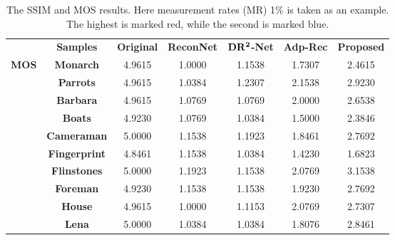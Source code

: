 \documentclass[review]{elsarticle}
\begin{document}
\begin{table}[h!]
	\centering
	\footnotesize
	\caption{The SSIM and MOS results. Here measurement rates (MR) 1\% is taken as an example. The highest is marked red, while the second is marked blue.
}
	\label{tab:SSIM}
	\renewcommand\arraystretch{0.8}
	\begin{tabular}{|c|cccccc|}
		\hline
		\rowcolor[HTML]{87B0FF}
		& \textbf{Samples} & \textbf{Original} & \textbf{ReconNet} & \textbf{$\bf{DR^2}$-Net} & \textbf{Adp-Rec}  & \textbf{Proposed}   \\
\multirow{12}{0.8cm}{\textbf{MOS}} & \textbf{Monarch}          & 4.9615           & 1.0000                       & {1.1538} & {\color[HTML]{0000FF} 1.7307} & {\color[HTML]{CC0000} 2.4615} \\
		& \textbf{Parrots}        & 4.9615           & 1.0384                       & {1.2307} & {\color[HTML]{0000FF} 2.1538} & {\color[HTML]{CC0000} 2.9230} \\
		& \textbf{Barbara}        & 4.9615           & 1.0769                       & {1.0769} & {\color[HTML]{0000FF} 2.0000} & {\color[HTML]{CC0000} 2.6538} \\
		& \textbf{Boats}          & 4.9230           & 1.0769                       & {1.0384} & {\color[HTML]{0000FF} 1.5000} & {\color[HTML]{CC0000} 2.3846}  \\
		& \textbf{Cameraman}      & 5.0000           & 1.1538                       & {1.1923} & {\color[HTML]{0000FF} 1.8461} & {\color[HTML]{CC0000} 2.7692} \\
		& \textbf{Fingerprint}    & 4.8461           & 1.1538                       & {1.0384} & {\color[HTML]{0000FF} 1.4230} & {\color[HTML]{CC0000} 1.6823} \\
		& \textbf{Flinstones}     & 5.0000           & 1.1923                       & {1.1538} & {\color[HTML]{0000FF} 2.0769} & {\color[HTML]{CC0000} 3.1538} \\
		& \textbf{Foreman}        & 4.9230           & 1.1538                       & {1.1538} & {\color[HTML]{0000FF} 1.9230} & {\color[HTML]{CC0000} 2.7692} \\
		& \textbf{House}          & 4.9615           & 1.0000                       & {1.1153} & {\color[HTML]{0000FF} 2.0769} & {\color[HTML]{CC0000} 2.7307} \\
		& \textbf{Lena}           & 5.0000           & 1.0384                       & {1.0384} & {\color[HTML]{0000FF} 1.8076} & {\color[HTML]{CC0000} 2.8461} \\

\end{tabular}
\end{table}
\end{document}

